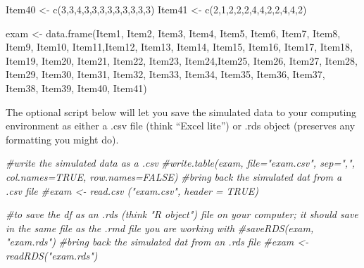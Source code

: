 \documentclass[
  english,
]{book}
\newenvironment{Shaded}{\begin{snugshade}}{\end{snugshade}}
\newcommand{\CommentTok}[1]{\textcolor[rgb]{0.56,0.35,0.01}{\textit{#1}}}
\newcommand{\DecValTok}[1]{\textcolor[rgb]{0.00,0.00,0.81}{#1}}
\newcommand{\FunctionTok}[1]{\textcolor[rgb]{0.00,0.00,0.00}{#1}}
\newcommand{\NormalTok}[1]{#1}
\newcommand{\OtherTok}[1]{\textcolor[rgb]{0.56,0.35,0.01}{#1}}
\begin{document}
\begin{Shaded}
\begin{Highlighting}[]
\NormalTok{Item40 }\OtherTok{\textless{}{-}} \FunctionTok{c}\NormalTok{(}\DecValTok{3}\NormalTok{,}\DecValTok{3}\NormalTok{,}\DecValTok{4}\NormalTok{,}\DecValTok{3}\NormalTok{,}\DecValTok{3}\NormalTok{,}\DecValTok{3}\NormalTok{,}\DecValTok{3}\NormalTok{,}\DecValTok{3}\NormalTok{,}\DecValTok{3}\NormalTok{,}\DecValTok{3}\NormalTok{,}\DecValTok{3}\NormalTok{,}\DecValTok{3}\NormalTok{)}
\NormalTok{Item41 }\OtherTok{\textless{}{-}} \FunctionTok{c}\NormalTok{(}\DecValTok{2}\NormalTok{,}\DecValTok{1}\NormalTok{,}\DecValTok{2}\NormalTok{,}\DecValTok{2}\NormalTok{,}\DecValTok{2}\NormalTok{,}\DecValTok{4}\NormalTok{,}\DecValTok{4}\NormalTok{,}\DecValTok{2}\NormalTok{,}\DecValTok{2}\NormalTok{,}\DecValTok{4}\NormalTok{,}\DecValTok{4}\NormalTok{,}\DecValTok{2}\NormalTok{)}

\NormalTok{exam }\OtherTok{\textless{}{-}} \FunctionTok{data.frame}\NormalTok{(Item1, Item2, Item3, Item4, Item5, Item6, Item7, Item8, Item9, Item10, Item11,Item12, Item13, Item14, Item15, Item16, Item17, Item18, Item19, Item20, Item21, Item22, Item23, Item24,Item25, Item26, Item27, Item28, Item29, Item30, Item31, Item32, Item33, Item34, Item35, Item36, Item37, Item38, Item39, Item40, Item41)}
\end{Highlighting}
\end{Shaded}

The optional script below will let you save the simulated data to your computing environment as either a .csv file (think ``Excel lite'') or .rds object (preserves any formatting you might do).

\begin{Shaded}
\begin{Highlighting}[]
\CommentTok{\#write the simulated data  as a .csv}
\CommentTok{\#write.table(exam, file="exam.csv", sep=",", col.names=TRUE, row.names=FALSE)}
\CommentTok{\#bring back the simulated dat from a .csv file}
\CommentTok{\#exam \textless{}{-} read.csv ("exam.csv", header = TRUE)}
\end{Highlighting}
\end{Shaded}

\begin{Shaded}
\begin{Highlighting}[]
\CommentTok{\#to save the df as an .rds (think "R object") file on your computer; it should save in the same file as the .rmd file you are working with}
\CommentTok{\#saveRDS(exam, "exam.rds")}
\CommentTok{\#bring back the simulated dat from an .rds file}
\CommentTok{\#exam \textless{}{-} readRDS("exam.rds")}
\end{Highlighting}
\end{Shaded}
\end{document}
